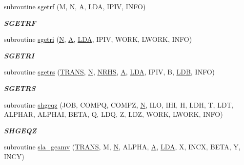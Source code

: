 \begin{DoxyCompactItemize}
subroutine \hyperlink{group__realGEcomputational_ga8d99c11b94db3d5eac75cac46a0f2e17}{sgetrf} (M, \hyperlink{polmisc_8c_a0240ac851181b84ac374872dc5434ee4}{N}, \hyperlink{classA}{A}, \hyperlink{example__user_8c_ae946da542ce0db94dced19b2ecefd1aa}{L\+D\+A}, I\+P\+I\+V, I\+N\+F\+O)
\begin{DoxyCompactList}\small\item\em {\bfseries S\+G\+E\+T\+R\+F} \end{DoxyCompactList}\item 
subroutine \hyperlink{group__realGEcomputational_ga1af62182327d0be67b1717db399d7d83}{sgetri} (\hyperlink{polmisc_8c_a0240ac851181b84ac374872dc5434ee4}{N}, \hyperlink{classA}{A}, \hyperlink{example__user_8c_ae946da542ce0db94dced19b2ecefd1aa}{L\+D\+A}, I\+P\+I\+V, W\+O\+R\+K, L\+W\+O\+R\+K, I\+N\+F\+O)
\begin{DoxyCompactList}\small\item\em {\bfseries S\+G\+E\+T\+R\+I} \end{DoxyCompactList}\item 
subroutine \hyperlink{group__realGEcomputational_gaa00bcf4d83a118cb6f0b6619d6ffaa24}{sgetrs} (\hyperlink{superlu__enum__consts_8h_a0c4e17b2d5cea33f9991ccc6a6678d62a1f61e3015bfe0f0c2c3fda4c5a0cdf58}{T\+R\+A\+N\+S}, \hyperlink{polmisc_8c_a0240ac851181b84ac374872dc5434ee4}{N}, \hyperlink{example__user_8c_aa0138da002ce2a90360df2f521eb3198}{N\+R\+H\+S}, \hyperlink{classA}{A}, \hyperlink{example__user_8c_ae946da542ce0db94dced19b2ecefd1aa}{L\+D\+A}, I\+P\+I\+V, B, \hyperlink{example__user_8c_a50e90a7104df172b5a89a06c47fcca04}{L\+D\+B}, I\+N\+F\+O)
\begin{DoxyCompactList}\small\item\em {\bfseries S\+G\+E\+T\+R\+S} \end{DoxyCompactList}\item 
subroutine \hyperlink{group__realGEcomputational_gaabb10a799ac110d898984792acafa8f4}{shgeqz} (J\+O\+B, C\+O\+M\+P\+Q, C\+O\+M\+P\+Z, \hyperlink{polmisc_8c_a0240ac851181b84ac374872dc5434ee4}{N}, I\+L\+O, I\+H\+I, H, L\+D\+H, T, L\+D\+T, A\+L\+P\+H\+A\+R, A\+L\+P\+H\+A\+I, B\+E\+T\+A, Q, L\+D\+Q, Z, L\+D\+Z, W\+O\+R\+K, L\+W\+O\+R\+K, I\+N\+F\+O)
\begin{DoxyCompactList}\small\item\em {\bfseries S\+H\+G\+E\+Q\+Z} \end{DoxyCompactList}\item 
subroutine \hyperlink{group__realGEcomputational_ga3e50914b0060d102e0c71d08ee0d5618}{sla\+\_\+geamv} (\hyperlink{superlu__enum__consts_8h_a0c4e17b2d5cea33f9991ccc6a6678d62a1f61e3015bfe0f0c2c3fda4c5a0cdf58}{T\+R\+A\+N\+S}, M, \hyperlink{polmisc_8c_a0240ac851181b84ac374872dc5434ee4}{N}, A\+L\+P\+H\+A, \hyperlink{classA}{A}, \hyperlink{example__user_8c_ae946da542ce0db94dced19b2ecefd1aa}{L\+D\+A}, X, I\+N\+C\+X, B\+E\+T\+A, Y, I\+N\+C\+Y)

\end{DoxyCompactItemize}
